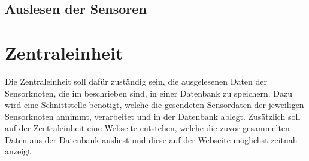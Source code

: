 \subsection{Auslesen der Sensoren}
\section{Zentraleinheit}
Die Zentraleinheit soll dafür zuständig sein, die ausgelesenen Daten der Sensorknoten, die im  beschrieben sind, in einer Datenbank zu speichern. Dazu wird eine Schnittstelle benötigt, welche die gesendeten Sensordaten der jeweiligen Sensorknoten annimmt, verarbeitet und in der Datenbank ablegt. Zusätzlich soll auf der Zentraleinheit eine Webseite entstehen, welche die zuvor gesammelten Daten aus der Datenbank ausliest und diese auf der Webseite möglichst zeitnah anzeigt.

